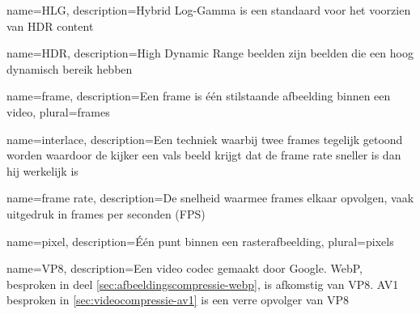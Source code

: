 {
	name={HLG},
	description={Hybrid Log-Gamma is een standaard voor het voorzien van HDR content}
}

{
	name={HDR},
	description={High Dynamic Range beelden zijn beelden die een hoog dynamisch bereik hebben}
}

{
	name={frame},
	description={Een frame is één stilstaande afbeelding binnen een video},
	plural={frames}
}

{
	name={interlace},
	description={Een techniek waarbij twee frames tegelijk getoond worden waardoor de kijker een vals beeld krijgt dat de frame rate sneller is dan hij werkelijk is}
}

{
	name={frame rate},
	description={De snelheid waarmee frames elkaar opvolgen, vaak uitgedruk in frames per seconden (FPS)}
}

{
	name={pixel},
	description={Één punt binnen een rasterafbeelding},
	plural={pixels}
}

{
	name={VP8},
	description={Een video codec gemaakt door Google. WebP, besproken in deel \ref{sec:afbeeldingscompressie-webp}, is afkomstig van VP8. AV1 besproken in \ref{sec:videocompressie-av1} is een verre opvolger van VP8}
}